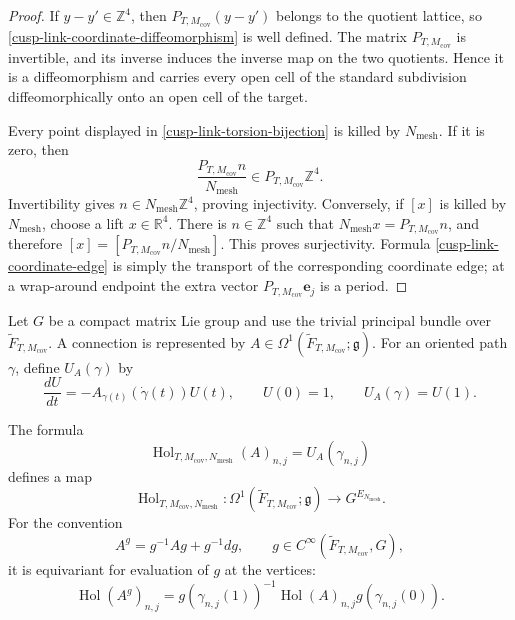 \begin{proof}
If \(y-y'\in\mathbb Z^4\), then
\(P_{T,M_{\mathrm{cov}}}(y-y')\) belongs to the quotient lattice, so
\eqref{cusp-link-coordinate-diffeomorphism} is well defined.  The matrix
\(P_{T,M_{\mathrm{cov}}}\) is invertible, and its inverse induces the
inverse map on the two quotients.  Hence it is a diffeomorphism and carries
every open cell of the standard subdivision diffeomorphically onto an open
cell of the target.

Every point displayed in \eqref{cusp-link-torsion-bijection} is killed by
\(N_{\mathrm{mesh}}\).  If it is zero, then
\[
 \frac{P_{T,M_{\mathrm{cov}}}n}{N_{\mathrm{mesh}}}
 \in P_{T,M_{\mathrm{cov}}}\mathbb Z^4.
\]
Invertibility gives
\(n\in N_{\mathrm{mesh}}\mathbb Z^4\), proving injectivity.  Conversely,
if \([x]\) is killed by \(N_{\mathrm{mesh}}\), choose a lift
\(x\in\mathbb R^4\).  There is \(n\in\mathbb Z^4\) such that
\(N_{\mathrm{mesh}}x=P_{T,M_{\mathrm{cov}}}n\), and therefore
\([x]=[P_{T,M_{\mathrm{cov}}}n/N_{\mathrm{mesh}}]\).  This proves
surjectivity.  Formula \eqref{cusp-link-coordinate-edge} is simply the
transport of the corresponding coordinate edge; at a wrap-around endpoint
the extra vector \(P_{T,M_{\mathrm{cov}}}\mathbf e_j\) is a period.
\end{proof}

Let \(G\) be a compact matrix Lie group and use the trivial principal bundle over
\(\widetilde F_{T,M_{\mathrm{cov}}}\).  A connection is represented by
\(A\in\Omega^1(\widetilde F_{T,M_{\mathrm{cov}}};\mathfrak g)\).  For an
oriented path \(\gamma\), define \(U_A(\gamma)\) by
\begin{equation}
 \frac{dU}{dt}=-A_{\gamma(t)}(\dot\gamma(t))U(t),
 \qquad U(0)=1,
 \qquad U_A(\gamma)=U(1).
 \label{cusp-link-parallel-transport-ode}
\end{equation}

\begin{proposition}
\label{cusp-link-holonomy-map}
The formula
\begin{equation}
 \operatorname{Hol}_{T,M_{\mathrm{cov}},N_{\mathrm{mesh}}}(A)_{n,j}
 =U_A(\gamma_{n,j})
 \label{cusp-link-holonomy-definition}
\end{equation}
defines a map
\begin{equation}
 \operatorname{Hol}_{T,M_{\mathrm{cov}},N_{\mathrm{mesh}}}:
 \Omega^1(\widetilde F_{T,M_{\mathrm{cov}}};\mathfrak g)
 \longrightarrow G^{E_{N_{\mathrm{mesh}}}}.
 \label{cusp-link-holonomy-typed}
\end{equation}
For the convention
\begin{equation}
 A^g=g^{-1}Ag+g^{-1}dg,
 \qquad
 g\in C^\infty(\widetilde F_{T,M_{\mathrm{cov}}},G),
 \label{cusp-link-gauge-convention}
\end{equation}
it is equivariant for evaluation of \(g\) at the vertices:
\begin{equation}
 \operatorname{Hol}(A^g)_{n,j}
 =g(\gamma_{n,j}(1))^{-1}
  \operatorname{Hol}(A)_{n,j}
  g(\gamma_{n,j}(0)).
 \label{cusp-link-holonomy-equivariance}
\end{equation}
\end{proposition}


